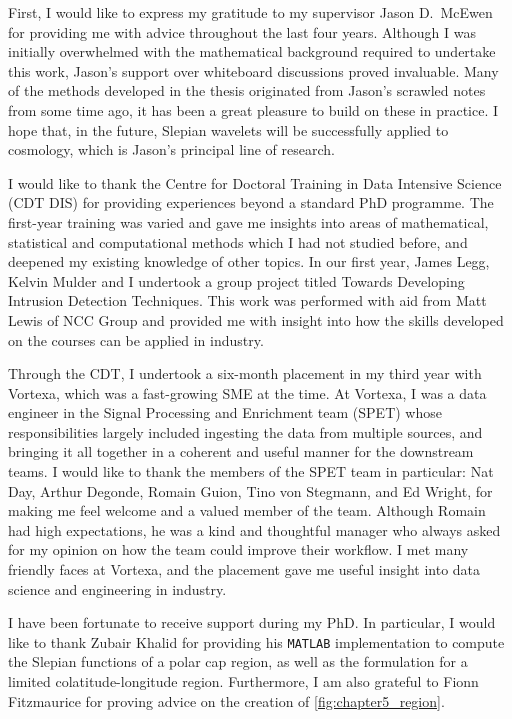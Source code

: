 \begin{acknowledgements}
    First, I would like to express my gratitude to my supervisor Jason D.~McEwen for providing me with advice throughout the last four years.
    Although I was initially overwhelmed with the mathematical background required to undertake this work, Jason's support over whiteboard discussions proved invaluable.
    Many of the methods developed in the thesis originated from Jason's scrawled notes from some time ago, it has been a great pleasure to build on these in practice.
    I hope that, in the future, Slepian wavelets will be successfully applied to cosmology, which is Jason's principal line of research.

    I would like to thank the Centre for Doctoral Training in Data Intensive Science (CDT DIS) for providing experiences beyond a standard PhD programme.
    The first-year training was varied and gave me insights into areas of mathematical, statistical and computational methods which I had not studied before, and deepened my existing knowledge of other topics.
    In our first year, James Legg, Kelvin Mulder and I undertook a group project titled Towards Developing Intrusion Detection Techniques.
    This work was performed with aid from Matt Lewis of NCC Group and provided me with insight into how the skills developed on the courses can be applied in industry.

    Through the CDT, I undertook a six-month placement in my third year with Vortexa, which was a fast-growing SME at the time.
    At Vortexa, I was a data engineer in the Signal Processing and Enrichment team (SPET) whose responsibilities largely included ingesting the data from multiple sources, and bringing it all together in a coherent and useful manner for the downstream teams.
    I would like to thank the members of the SPET team in particular: Nat Day, Arthur Degonde, Romain Guion, Tino von Stegmann, and Ed Wright, for making me feel welcome and a valued member of the team.
    Although Romain had high expectations, he was a kind and thoughtful manager who always asked for my opinion on how the team could improve their workflow.
    I met many friendly faces at Vortexa, and the placement gave me useful insight into data science and engineering in industry.

    I have been fortunate to receive support during my PhD.
    In particular, I would like to thank Zubair Khalid for providing his \texttt{MATLAB} implementation to compute the Slepian functions of a polar cap region, as well as the formulation for a limited colatitude-longitude region.
    Furthermore, I am also grateful to Fionn Fitzmaurice for proving advice on the creation of \cref{fig:chapter5_region}.


\end{acknowledgements}

